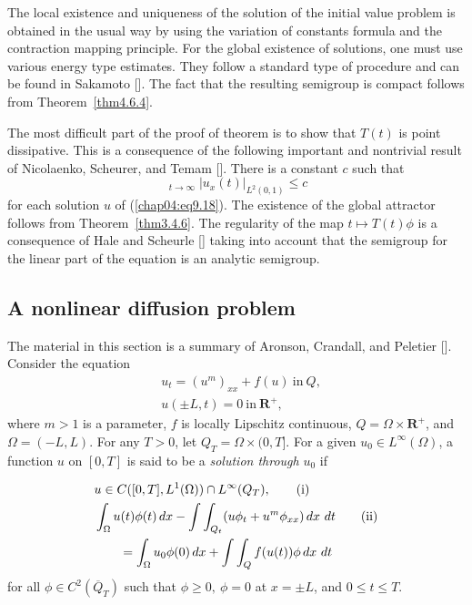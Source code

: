 \documentclass{surv-l}
\theoremstyle{plain}
\theoremstyle{definition}
\numberwithin{equation}{section}
\numberwithin{figure}{chapter}
\begin{document}
The local existence and uniqueness of the solution of the initial value problem is obtained in the usual way by using the variation of constants formula and the contraction mapping principle. For the global existence of solutions, one must use various energy type estimates. They follow a standard type of procedure and can be found in Sakamoto [\citeyear{1986s}]. The fact that the resulting semigroup is compact follows from Theorem~\ref{thm4.6.4}.

The most difficult part of the proof of theorem is to show that $T(t)$ is point dissipative. This is a consequence of the following important and nontrivial result of Nicolaenko, Scheurer, and Temam [\citeyear{1985nst}]. There is a constant $c$ such that
\begin{equation*}
\mathop{\overline{\lim}}_{t\rightarrow\infty}|u_{x}(t)|_{L^{2}(0,1)}\leq c
\end{equation*}
for each solution $u$ of (\ref{chap04:eq9.18}). The existence of the global attractor follows from Theorem~\ref{thm3.4.6}. The regularity of the map $t\mapsto T(t)\phi$ is a consequence of Hale and Scheurle [\citeyear{1985hs}] taking into account that the semigroup for the linear part of the equation is an analytic semigroup.

\subsection[A Nonlinear diffusion problem]{A nonlinear diffusion problem}\label{subsec4.9.6} The material in this section is a summary of Aronson, Crandall, and Peletier [\citeyear{1982acp}]. Consider the equation
\begin{equation}\label{chap04:eq9.20}
\begin{split}
& u_{t}=(u^{m})_{xx}+f(u)\ \mathrm{in}\ Q,\\
& u(\pm L, t)=0\ \mathrm{in}\ \mathbf{R}^{+},
\end{split}
\end{equation}
where $m>1$ is a parameter, $f$ is locally Lipschitz continuous, $Q=\Omega\times \mathbf{R}^{+}$, and $\Omega =(-L, L)$. For any $T>0$, let $Q_{T}=\Omega \times(0, T]$. For a given $u_{0}\in L^{\infty}(\Omega)$, a function $u$ on $[0, T]$ is said to be a \emph{solution through} $u_{0}$ if


\begin{align}\label{chap04:eqi}
&u\in C([0, T], L^{1}(\Omega))\cap L^{\infty}(Q_{T}),\tag{$\mathrm{i}$}\\
&\int_{\Omega}u(t)\phi(t)\, dx-\int\int_{Q_{t}}(u\phi_{t}+u^{m}\phi_{xx})\, dx\ dt \tag{$\mathrm{ii}$}\\
&\qquad=\int_{\Omega}u_{0}\phi(0)\, dx+\int\int_{Q}f(u(t))\phi\, dx\ dt\nonumber
\end{align}
for all $\phi\in C^{2}(\overline{Q}_{T})$ such that $\phi\geq 0,\ \phi=0$ at $x=\pm L$, and $0\leq t\leq T$.
\end{document}
